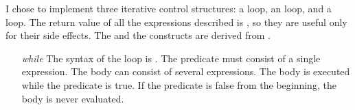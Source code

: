 \begin{exe}[4.9]
    I chose to implement three iterative control structures: a  
    loop, an  loop, and a  loop. The return value of all 
    the expressions described is , so they are useful only for their 
    side effects. The  and the  constructs are derived 
    from .
    \begin{itemize}
        \item[\emph{while}] The syntax of the  loop is
            . The predicate must consist of 
            a single expression. The body can consist of several expressions. 
            The body is executed while the predicate is true. If the predicate 
            is false from the beginning, the body is never evaluated.


\end{itemize}
\end{exe}
